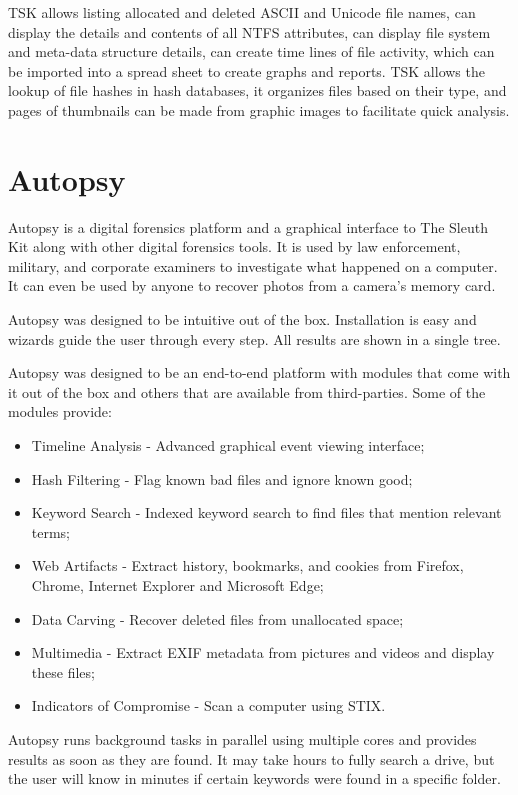 TSK allows listing allocated and deleted ASCII and Unicode file names, can display the
details and contents of all NTFS attributes, can display file system and meta-data structure details,
can create time lines of file activity, which can be imported into a spread sheet to create graphs and reports.
TSK allows the lookup of file hashes in hash databases, it organizes files based on their type, and pages of
thumbnails can be made from graphic images to facilitate quick analysis.

\section{Autopsy}

Autopsy is a digital forensics platform and a graphical interface to The Sleuth Kit
along with other digital forensics tools. It is used by law enforcement, military, 
and corporate examiners to investigate what happened on a computer. It can even 
be used by anyone to recover photos from a camera's memory card.

Autopsy was designed to be intuitive out of the box. Installation is easy and
wizards guide the user through every step. All results are shown in a single tree.

Autopsy was designed to be an end-to-end platform with modules that come with
it out of the box and others that are available from third-parties. Some of the
modules provide:

\begin{itemize}
\item Timeline Analysis - Advanced graphical event viewing interface;
\item Hash Filtering - Flag known bad files and ignore known good;
\item Keyword Search - Indexed keyword search to find files that mention relevant
terms;
\item Web Artifacts - Extract history, bookmarks, and cookies from Firefox, Chrome,
Internet Explorer and Microsoft Edge;
\item Data Carving - Recover deleted files from unallocated space;
\item Multimedia - Extract EXIF metadata from pictures and videos and display these files;
\item Indicators of Compromise - Scan a computer using STIX.
\end{itemize}

Autopsy runs background tasks in parallel using multiple cores and provides results as soon as they are found.
It may take hours to fully search a drive, but the user will know in minutes if certain keywords were found in a specific folder.

